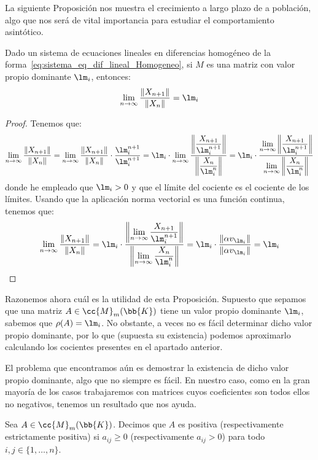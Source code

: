 La siguiente Proposición nos muestra el crecimiento a largo plazo de a población, algo que nos será de vital importancia para estudiar el comportamiento asintótico.
\begin{prop}
    Dado un sistema de ecuaciones lineales en diferencias homogéneo  de la forma~\ref{eq:sistema_eq_dif_lineal_Homogeneo}, si $M$ es una matriz con valor propio dominante $\lm_i$, entonces:
    \begin{equation*}
        \lim_{n\to \infty} \frac{\|X_{n+1}\|}{\|X_n\|} = \lm_i
    \end{equation*}
    \begin{proof}
        Tenemos que:
        \begin{equation*}
            \lim_{n\to \infty} \frac{\|X_{n+1}\|}{\|X_n\|}
            = \lim_{n\to \infty} \frac{\|X_{n+1}\|}{\|X_n\|} \cdot \frac{\lm_i^{n+1}}{\lm_i^{n+1}}
            = \lm_i\cdot \lim\limits_{n\to \infty}\dfrac{\left\|\dfrac{X_{n+1}}{\lm_i^{n+1}}\right\|}{\left\|\dfrac{X_{n}}{\lm_i^{n}}\right\|}
            = \lm_i\cdot \dfrac{\lim\limits_{n\to \infty} \left\|\dfrac{X_{n+1}}{\lm_i^{n+1}}\right\|}{\lim\limits_{n\to \infty} \left\|\dfrac{X_{n}}{\lm_i^{n}}\right\|}
        \end{equation*}
        donde he empleado que $\lm_i>0$ y que el límite del cociente es el cociente de los límites. Usando que la aplicación norma vectorial es una función continua, tenemos que:
        \begin{equation*}
            \lim_{n\to \infty} \frac{\|X_{n+1}\|}{\|X_n\|}
            = \lm_i\cdot \dfrac{\left\|\lim\limits_{n\to \infty}\dfrac{X_{n+1}}{\lm_i^{n+1}}\right\|}{\left\|\lim\limits_{n\to \infty}\dfrac{X_{n}}{\lm_i^{n}}\right\|}
            = \lm_i\cdot \frac{\|\alpha v_{\lm_i}\|}{\|\alpha v_{\lm_i}\|}
            = \lm_i
        \end{equation*}
    \end{proof}
\end{prop}

Razonemos ahora cuál es la utilidad de esta Proposición. Supuesto que sepamos que una matriz $A\in \cc{M}_m(\bb{K})$ tiene un valor propio dominante $\lm_i$, sabemos que $\rho(A)=\lm_i$. No obstante, a veces no es fácil determinar dicho valor propio dominante, por lo que (supuesta su existencia) podemos aproximarlo calculando los cocientes presentes en el apartado anterior.

El problema que encontramos aún es demostrar la existencia de dicho valor propio dominante, algo que no siempre es fácil. En nuestro caso, como en la gran mayoría de los casos trabajaremos con matrices cuyos coeficientes son todos ellos no negativos, tenemos un resultado que nos ayuda.
\begin{definicion}
    Sea $A\in \cc{M}_m(\bb{K})$. Decimos que $A$ es positiva (respectivamente estrictamente positiva) si $a_{ij}\geq 0$ (respectivamente $a_{ij}>0$) para todo $i,j\in \{1,\dots, n\}$.
\end{definicion}

